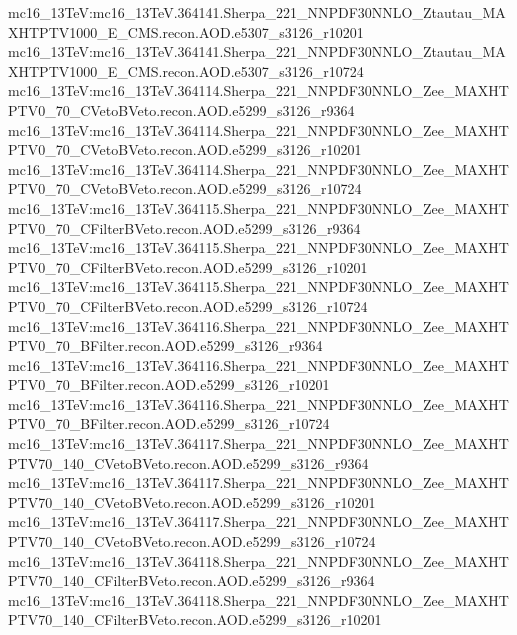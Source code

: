 { mc16\_13TeV:mc16\_13TeV.364141.Sherpa\_221\_NNPDF30NNLO\_Ztautau\_MAXHTPTV1000\_E\_CMS.recon.AOD.e5307\_s3126\_r10201 \newline 
 mc16\_13TeV:mc16\_13TeV.364141.Sherpa\_221\_NNPDF30NNLO\_Ztautau\_MAXHTPTV1000\_E\_CMS.recon.AOD.e5307\_s3126\_r10724 \newline  
 mc16\_13TeV:mc16\_13TeV.364114.Sherpa\_221\_NNPDF30NNLO\_Zee\_MAXHTPTV0\_70\_CVetoBVeto.recon.AOD.e5299\_s3126\_r9364  \newline 
 mc16\_13TeV:mc16\_13TeV.364114.Sherpa\_221\_NNPDF30NNLO\_Zee\_MAXHTPTV0\_70\_CVetoBVeto.recon.AOD.e5299\_s3126\_r10201  \newline 
 mc16\_13TeV:mc16\_13TeV.364114.Sherpa\_221\_NNPDF30NNLO\_Zee\_MAXHTPTV0\_70\_CVetoBVeto.recon.AOD.e5299\_s3126\_r10724 \newline  
 mc16\_13TeV:mc16\_13TeV.364115.Sherpa\_221\_NNPDF30NNLO\_Zee\_MAXHTPTV0\_70\_CFilterBVeto.recon.AOD.e5299\_s3126\_r9364 \newline  
 mc16\_13TeV:mc16\_13TeV.364115.Sherpa\_221\_NNPDF30NNLO\_Zee\_MAXHTPTV0\_70\_CFilterBVeto.recon.AOD.e5299\_s3126\_r10201 \newline  
 mc16\_13TeV:mc16\_13TeV.364115.Sherpa\_221\_NNPDF30NNLO\_Zee\_MAXHTPTV0\_70\_CFilterBVeto.recon.AOD.e5299\_s3126\_r10724 \newline  
 mc16\_13TeV:mc16\_13TeV.364116.Sherpa\_221\_NNPDF30NNLO\_Zee\_MAXHTPTV0\_70\_BFilter.recon.AOD.e5299\_s3126\_r9364 \newline  
 mc16\_13TeV:mc16\_13TeV.364116.Sherpa\_221\_NNPDF30NNLO\_Zee\_MAXHTPTV0\_70\_BFilter.recon.AOD.e5299\_s3126\_r10201  \newline 
 mc16\_13TeV:mc16\_13TeV.364116.Sherpa\_221\_NNPDF30NNLO\_Zee\_MAXHTPTV0\_70\_BFilter.recon.AOD.e5299\_s3126\_r10724 \newline  
 mc16\_13TeV:mc16\_13TeV.364117.Sherpa\_221\_NNPDF30NNLO\_Zee\_MAXHTPTV70\_140\_CVetoBVeto.recon.AOD.e5299\_s3126\_r9364 \newline  
 mc16\_13TeV:mc16\_13TeV.364117.Sherpa\_221\_NNPDF30NNLO\_Zee\_MAXHTPTV70\_140\_CVetoBVeto.recon.AOD.e5299\_s3126\_r10201 \newline  
 mc16\_13TeV:mc16\_13TeV.364117.Sherpa\_221\_NNPDF30NNLO\_Zee\_MAXHTPTV70\_140\_CVetoBVeto.recon.AOD.e5299\_s3126\_r10724 \newline  
 mc16\_13TeV:mc16\_13TeV.364118.Sherpa\_221\_NNPDF30NNLO\_Zee\_MAXHTPTV70\_140\_CFilterBVeto.recon.AOD.e5299\_s3126\_r9364 \newline  
 mc16\_13TeV:mc16\_13TeV.364118.Sherpa\_221\_NNPDF30NNLO\_Zee\_MAXHTPTV70\_140\_CFilterBVeto.recon.AOD.e5299\_s3126\_r10201  \newline 
}
